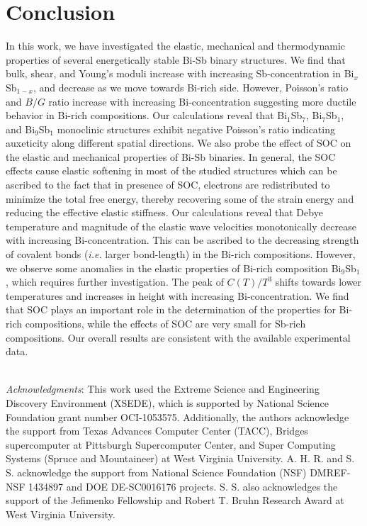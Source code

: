 \documentclass[twocolumn,superscriptaddress,nofootinbib,floatfix,aps,showpacs,prb,citeautoscript,reprint]{revtex4-1}
\begin{document}
\section{Conclusion}
In this work, we have investigated the elastic, mechanical and thermodynamic properties of several energetically stable Bi-Sb binary structures. We find that bulk, shear, and Young's moduli increase with increasing Sb-concentration in Bi$_{x}$Sb$_{1-x}$, and decrease as we move towards Bi-rich side. However, Poisson's ratio and $B/G$ ratio increase with increasing Bi-concentration suggesting more ductile behavior in Bi-rich compositions. Our calculations reveal that Bi$_{1}$Sb$_{7}$, Bi$_{7}$Sb$_{1}$, and Bi$_{9}$Sb$_{1}$ monoclinic structures exhibit negative Poisson's ratio indicating auxeticity along different spatial directions. We also probe the effect of SOC on the elastic and mechanical properties of Bi-Sb binaries. In general, the SOC effects cause elastic softening in most of the studied structures which can be ascribed to the fact that in presence of SOC, electrons are redistributed to minimize the total free energy, thereby recovering some of the strain energy and reducing the effective elastic stiffness. Our calculations reveal that Debye temperature and magnitude of the elastic wave velocities monotonically decrease with increasing Bi-concentration. This can be ascribed to the decreasing strength of covalent bonds ({\it i.e.} larger bond-length) in the Bi-rich compositions. However, we observe some anomalies in the elastic properties of Bi-rich composition Bi$_{9}$Sb$_{1}$, which requires further investigation. The peak of $C(T)/T^3$ shifts towards lower temperatures and increases in height with increasing Bi-concentration. We find that SOC plays an important role in the determination of the properties for Bi-rich compositions, while the effects of SOC are very small for Sb-rich compositions.  Our overall results are consistent with the available experimental data. 


\textit{\\ Acknowledgments}: This work used the Extreme Science and Engineering Discovery Environment (XSEDE), which is supported by National Science Foundation grant number OCI-1053575. Additionally, the authors acknowledge the support from Texas Advances Computer Center (TACC), Bridges supercomputer at Pittsburgh Supercomputer Center, and Super Computing Systems (Spruce and Mountaineer) at West Virginia University. A. H. R. and S. S. acknowledge the support from National Science Foundation (NSF) DMREF-NSF 1434897 and DOE DE-SC0016176 projects. S. S. also acknowledges the support of the Jefimenko Fellowship and Robert T. Bruhn Research Award at West Virginia University.



\end{document}
